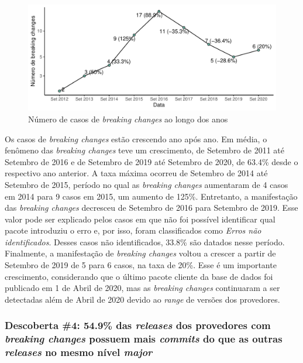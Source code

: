 \begin{figure}
	\centering
	\includegraphics[scale=0.7]{figuras/plot_rq1_2.pdf}
	\caption{Número de casos de \textit{breaking changes} ao longo dos anos}
	\label{fig:plot_rq1_2}
\end{figure}{}

Os casos de \textit{breaking changes} estão crescendo ano após ano. Em média, o fenômeno das \textit{breaking changes} teve um crescimento, de Setembro de 2011 até Setembro de 2016 e de Setembro de 2019 até Setembro de 2020, de 63.4\% desde o respectivo ano anterior. A taxa máxima ocorreu de Setembro de 2014 até Setembro de 2015, período no qual as \textit{breaking changes} aumentaram de 4 casos em 2014 para 9 casos em 2015, um aumento de 125\%. Entretanto, a manifestação das \textit{breaking changes} decresceu de Setembro de 2016 para Setembro de 2019. Esse valor pode ser explicado pelos casos em que não foi possível identificar qual pacote introduziu o erro e, por isso, foram classificados como \textit{Erros não identificados}. Desses casos não identificados, 33.8\% são datados nesse período. Finalmente, a manifestação de \textit{breaking changes} voltou a crescer a partir de Setembro de 2019 de 5 para 6 casos, na taxa de 20\%. Esse é um importante crescimento, considerando que o último pacote cliente da base de dados foi publicado em 1 de Abril de 2020, mas as \textit{breaking changes} continuaram a ser detectadas além de Abril de 2020 devido ao \textit{range} de versões dos provedores.

\subsubsection{Descoberta \#4: 54.9\% das \textit{releases} dos provedores com \textit{breaking changes} possuem mais \textit{commits} do que as outras \textit{releases} no mesmo nível \textit{major}}

